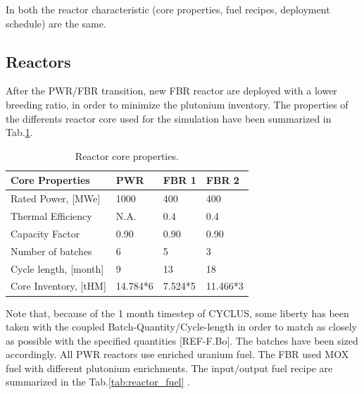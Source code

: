 \documentclass[12pt]{article}
\begin{document}
In both the reactor characteristic (core properties, fuel recipes, deployment schedule) are the same.
\subsection{Reactors}
After the PWR/FBR transition, new FBR reactor are deployed with a lower breeding ratio, in order to minimize the plutonium inventory. The properties of the differents reactor core used for the simulation have been summarized in Tab.\ref{tab:reactor}.\\


\begin{table}[h!]
\centering
\begin{tabular}{llll}
\hline
Core Properties		&	PWR 	&	FBR 1	&	FBR 2 	\\
\hline
Rated Power, [MWe]	&	1000		&	400		&	400		\\
Thermal Efficiency	&	N.A.		&	0.4		&	0.4		\\
Capacity Factor		&	0.90		&	0.90		&	0.90		\\
Number of batches	&	6		&	5		&	3		\\
Cycle length, [month]&	9		&	13		&	18		\\
Core Inventory, [tHM]&	14.784*6	&	7.524*5	&	11.466*3	\\
\hline
\end{tabular}
\caption{Reactor core properties.}
\label{tab:reactor}
\end{table}
Note that, because of the 1 month timestep of CYCLUS, some liberty has been taken with the coupled Batch-Quantity/Cycle-length in order to match as closely as possible with the specified quantities [REF-F.Bo]. The batches have been sized accordingly. All PWR reactors use enriched uranium fuel. The FBR used MOX fuel with different plutonium enrichments. The input/output fuel recipe are summarized in the Tab.\ref{tab:reactor_fuel} \cite{B.Feng_calculation}.
\end{document}
